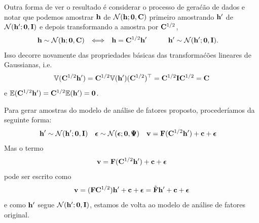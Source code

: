 \begin{exenumerate}
\begin{solution}
        Outra forma de ver o resultado \'e considerar o processo de gera\'c\~ao de
        dados e notar que podemos amostrar $\mathbf{h}$ de $\mathcal{N}(\mathbf{h}; \boldsymbol{0}, \mathbf{C})$
        primeiro amostrando $\mathbf{h}'$ de $\mathcal{N}(\mathbf{h}'; \boldsymbol{0}, \mathbf{I})$ e depois transformando a amostra por $\mathbf{C}^{1/2}$,
        \begin{align}
            \mathbf{h} &\sim \mathcal{N}(\mathbf{h}; \boldsymbol{0}, \mathbf{C})  & \Longleftrightarrow && \mathbf{h} &= \mathbf{C}^{1/2} \mathbf{h}' \quad \quad \quad \mathbf{h}' \sim \mathcal{N}(\mathbf{h}'; \boldsymbol{0}, \mathbf{I}).
        \end{align}
        Isso decorre novamente das propriedades b\'asicas das transforma\'c\~oes lineares de Gaussianas, i.e.
        $$ \mathbb{V}(\mathbf{C}^{1/2} \mathbf{h}') = \mathbf{C}^{1/2}\mathbb{V}(\mathbf{h}')(\mathbf{C}^{1/2})^\top =  \mathbf{C}^{1/2}\mathbf{I} \mathbf{C}^{1/2} =  \mathbf{C}$$
        e $\mathbb{E}(\mathbf{C}^{1/2} \mathbf{h}') = \mathbf{C}^{1/2} \mathbb{E}(\mathbf{h}') = \boldsymbol{0}$.
        
        Para gerar amostras do modelo de an\'alise de fatores proposto, proceder\'iamos da seguinte forma:
        \begin{align}
            \mathbf{h}' &\sim \mathcal{N}(\mathbf{h}'; \boldsymbol{0}, \mathbf{I}) & \boldsymbol{\epsilon} &\sim \mathcal{N}(\boldsymbol{\epsilon}; \boldsymbol{0}, \pmb{\Psi}) &  \mathbf{v} &= \mathbf{F} (\mathbf{C}^{1/2}\mathbf{h}') + \mathbf{c} + \boldsymbol{\epsilon}
        \end{align}
        Mas o termo
        $$ \mathbf{v} = \mathbf{F} (\mathbf{C}^{1/2}\mathbf{h}') + \mathbf{c} + \boldsymbol{\epsilon}$$
        pode ser escrito como
        $$\mathbf{v} = (\mathbf{F} \mathbf{C}^{1/2} ) \mathbf{h}' + \mathbf{c} + \boldsymbol{\epsilon} = \tilde{\mathbf{F}} \mathbf{h}' + \mathbf{c} + \boldsymbol{\epsilon}$$
        e como $\mathbf{h}'$ segue $\mathcal{N}(\mathbf{h}'; \boldsymbol{0}, \mathbf{I})$, estamos de volta ao modelo de an\'alise de fatores original.
        
    \end{solution}
\end{exenumerate}



\label{ex:ex2-alt}

